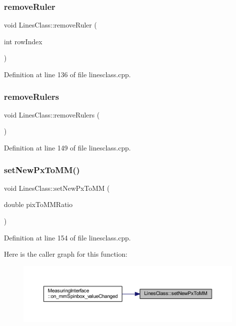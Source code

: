 \subsubsection{\texorpdfstring{removeRuler}{removeRuler}}
{\footnotesize\ttfamily void Lines\+Class\+::remove\+Ruler (\begin{DoxyParamCaption}\item[{int}]{row\+Index }\end{DoxyParamCaption})\hspace{0.3cm}{\ttfamily [slot]}}



Definition at line 136 of file linesclass.\+cpp.

\mbox{\label{classLinesClass_a6214ae9c3e61143c6ee013e55d346281}} 
\subsubsection{\texorpdfstring{removeRulers}{removeRulers}}
{\footnotesize\ttfamily void Lines\+Class\+::remove\+Rulers (\begin{DoxyParamCaption}{ }\end{DoxyParamCaption})\hspace{0.3cm}{\ttfamily [slot]}}



Definition at line 149 of file linesclass.\+cpp.

\mbox{\label{classLinesClass_a27046d1871f85101660c20703d87b1db}} 
\subsubsection{\texorpdfstring{setNewPxToMM()}{setNewPxToMM()}}
{\footnotesize\ttfamily void Lines\+Class\+::set\+New\+Px\+To\+MM (\begin{DoxyParamCaption}\item[{double}]{pix\+To\+M\+M\+Ratio }\end{DoxyParamCaption})}



Definition at line 154 of file linesclass.\+cpp.

Here is the caller graph for this function\+:
\nopagebreak
\begin{figure}[H]
\begin{center}
\leavevmode
\includegraphics[width=350pt]{classLinesClass_a27046d1871f85101660c20703d87b1db_icgraph}
\end{center}
\end{figure}


